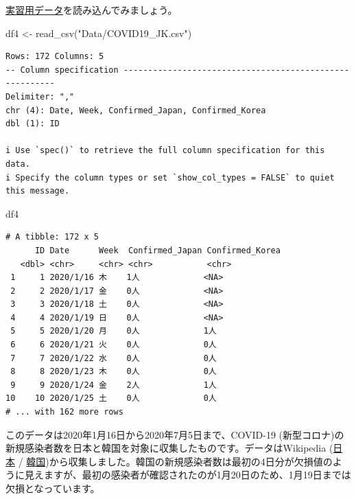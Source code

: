 \documentclass[
  a4paper,
  pandoc,
  ja=standard,
  jafont=haranoaji]{bxjsbook}
\newenvironment{Shaded}{\begin{snugshade}}{\end{snugshade}}
\newcommand{\FunctionTok}[1]{\textcolor[rgb]{0.28,0.35,0.67}{#1}}
\newcommand{\NormalTok}[1]{\textcolor[rgb]{0.00,0.48,0.65}{#1}}
\newcommand{\OtherTok}[1]{\textcolor[rgb]{0.00,0.48,0.65}{#1}}
\newcommand{\StringTok}[1]{\textcolor[rgb]{0.13,0.47,0.30}{#1}}
\begin{document}
\href{Data/COVID19_JK.csv}{実習用データ}を読み込んでみましょう。

\begin{Shaded}
\begin{Highlighting}[numbers=left,,]
\NormalTok{df4 }\OtherTok{\textless{}{-}} \FunctionTok{read\_csv}\NormalTok{(}\StringTok{"Data/COVID19\_JK.csv"}\NormalTok{)}
\end{Highlighting}
\end{Shaded}

\begin{verbatim}
Rows: 172 Columns: 5
-- Column specification --------------------------------------------------------
Delimiter: ","
chr (4): Date, Week, Confirmed_Japan, Confirmed_Korea
dbl (1): ID

i Use `spec()` to retrieve the full column specification for this data.
i Specify the column types or set `show_col_types = FALSE` to quiet this message.
\end{verbatim}

\begin{Shaded}
\begin{Highlighting}[numbers=left,,]
\NormalTok{df4}
\end{Highlighting}
\end{Shaded}

\begin{verbatim}
# A tibble: 172 x 5
      ID Date      Week  Confirmed_Japan Confirmed_Korea
   <dbl> <chr>     <chr> <chr>           <chr>          
 1     1 2020/1/16 木    1人             <NA>           
 2     2 2020/1/17 金    0人             <NA>           
 3     3 2020/1/18 土    0人             <NA>           
 4     4 2020/1/19 日    0人             <NA>           
 5     5 2020/1/20 月    0人             1人            
 6     6 2020/1/21 火    0人             0人            
 7     7 2020/1/22 水    0人             0人            
 8     8 2020/1/23 木    0人             0人            
 9     9 2020/1/24 金    2人             1人            
10    10 2020/1/25 土    0人             0人            
# ... with 162 more rows
\end{verbatim}

このデータは2020年1月16日から2020年7月5日まで、COVID-19
(新型コロナ)の新規感染者数を日本と韓国を対象に収集したものです。データはWikipedia
(\href{https://en.wikipedia.org/wiki/COVID-19_pandemic_in_Japan}{日本} /
\href{https://en.wikipedia.org/wiki/COVID-19_pandemic_in_South_Korea}{韓国})から収集しました。韓国の新規感染者数は最初の4日分が欠損値のように見えますが、最初の感染者が確認されたのが1月20日のため、1月19日までは欠損となっています。
\end{document}
